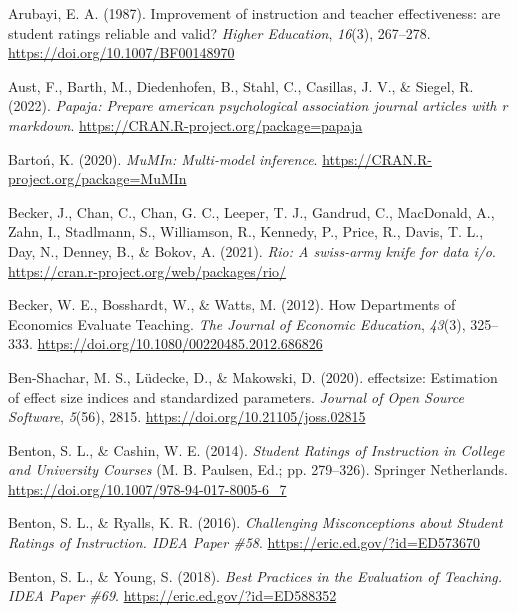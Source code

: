 \documentclass[
  man]{apa7}
\newlength{\cslhangindent}
\newenvironment{CSLReferences}[2] %
 {\begin{list}{}{%
  \setlength{\itemindent}{0pt}
  \setlength{\leftmargin}{0pt}
  \setlength{\parsep}{0pt}
  \ifodd #1
   \setlength{\leftmargin}{\cslhangindent}
   \setlength{\itemindent}{-1\cslhangindent}
  \fi
  \setlength{\itemsep}{#2\baselineskip}}}
 {\end{list}}
\begin{document}
\label{refs}
\begin{CSLReferences}{1}{0}
Arubayi, E. A. (1987). Improvement of instruction and teacher effectiveness: are student ratings reliable and valid? \emph{Higher Education}, \emph{16}(3), 267--278. \url{https://doi.org/10.1007/BF00148970}

Aust, F., Barth, M., Diedenhofen, B., Stahl, C., Casillas, J. V., \& Siegel, R. (2022). \emph{Papaja: Prepare american psychological association journal articles with r markdown}. \url{https://CRAN.R-project.org/package=papaja}

Bartoń, K. (2020). \emph{MuMIn: Multi-model inference}. \url{https://CRAN.R-project.org/package=MuMIn}

Becker, J., Chan, C., Chan, G. C., Leeper, T. J., Gandrud, C., MacDonald, A., Zahn, I., Stadlmann, S., Williamson, R., Kennedy, P., Price, R., Davis, T. L., Day, N., Denney, B., \& Bokov, A. (2021). \emph{Rio: A swiss-army knife for data i/o}. \url{https://cran.r-project.org/web/packages/rio/}

Becker, W. E., Bosshardt, W., \& Watts, M. (2012). How Departments of Economics Evaluate Teaching. \emph{The Journal of Economic Education}, \emph{43}(3), 325--333. \url{https://doi.org/10.1080/00220485.2012.686826}

Ben-Shachar, M. S., Lüdecke, D., \& Makowski, D. (2020). {e}ffectsize: Estimation of effect size indices and standardized parameters. \emph{Journal of Open Source Software}, \emph{5}(56), 2815. \url{https://doi.org/10.21105/joss.02815}

Benton, S. L., \& Cashin, W. E. (2014). \emph{Student Ratings of Instruction in College and University Courses} (M. B. Paulsen, Ed.; pp. 279--326). Springer Netherlands. \url{https://doi.org/10.1007/978-94-017-8005-6_7}

Benton, S. L., \& Ryalls, K. R. (2016). \emph{Challenging Misconceptions about Student Ratings of Instruction. IDEA Paper {\#}58}. \url{https://eric.ed.gov/?id=ED573670}

Benton, S. L., \& Young, S. (2018). \emph{Best Practices in the Evaluation of Teaching. IDEA Paper {\#}69}. \url{https://eric.ed.gov/?id=ED588352}


\end{CSLReferences}
\end{document}
